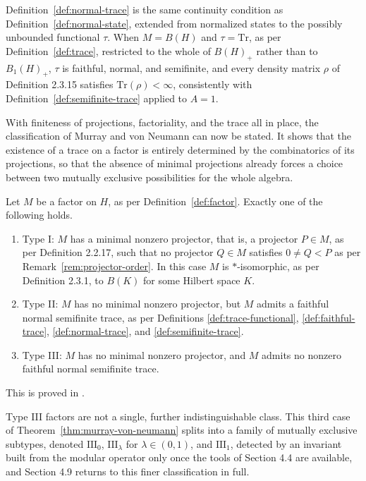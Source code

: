 \begin{remark}
	Definition~\ref{def:normal-trace} is the same continuity condition as
	Definition~\ref{def:normal-state}, extended from normalized states to
	the possibly unbounded functional $\tau$. When $M = B(H)$ and $\tau =
	\mathrm{Tr}$, as per Definition~\ref{def:trace}, restricted to the
	whole of $B(H)_+$ rather than to $B_1(H)_+$, $\tau$ is faithful, normal,
	and semifinite, and every density matrix $\rho$ of Definition 2.3.15
	satisfies $\mathrm{Tr}(\rho) < \infty$, consistently with
	Definition~\ref{def:semifinite-trace} applied to $A = 1$.
\end{remark}

With finiteness of projections, factoriality, and the trace all in
place, the classification of Murray and von Neumann can now be stated.
It shows that the existence of a trace on a factor is entirely
determined by the combinatorics of its projections, so that the
absence of minimal projections already forces a choice between two
mutually exclusive possibilities for the whole algebra.

\begin{theorem}\label{thm:murray-von-neumann}
	Let $M$ be a factor on $H$, as per Definition~\ref{def:factor}. Exactly
	one of the following holds.
	\begin{enumerate}
		\item Type I: $M$ has a minimal nonzero projector, that is, a
		projector $P \in M$, as per Definition 2.2.17, such that no projector
		$Q \in M$ satisfies $0 \neq Q < P$ as per
		Remark~\ref{rem:projector-order}. In this case $M$ is $*$-isomorphic,
		as per Definition 2.3.1, to $B(K)$ for some Hilbert space $K$.
		\item Type II: $M$ has no minimal nonzero projector, but $M$ admits a
		faithful normal semifinite trace, as per Definitions
		\ref{def:trace-functional}, \ref{def:faithful-trace},
		\ref{def:normal-trace}, and \ref{def:semifinite-trace}.
		\item Type III: $M$ has no minimal nonzero projector, and $M$ admits
		no nonzero faithful normal semifinite trace.
	\end{enumerate}
\end{theorem}
\noindent This is proved in \cite[TODO: collocazione precisa]{TODO-MurrayVonNeumann}.

\begin{remark}
	Type III factors are not a single, further indistinguishable class.
	This third case of Theorem~\ref{thm:murray-von-neumann} splits into a
	family of mutually exclusive subtypes, denoted $\mathrm{III}_0$,
	$\mathrm{III}_\lambda$ for $\lambda \in (0,1)$, and $\mathrm{III}_1$,
	detected by an invariant built from the modular operator only once the
	tools of Section 4.4 are available, and Section 4.9 returns to this
	finer classification in full. \cite[TODO: collocazione
	precisa]{TODO-fineTypeIII}
\end{remark}

